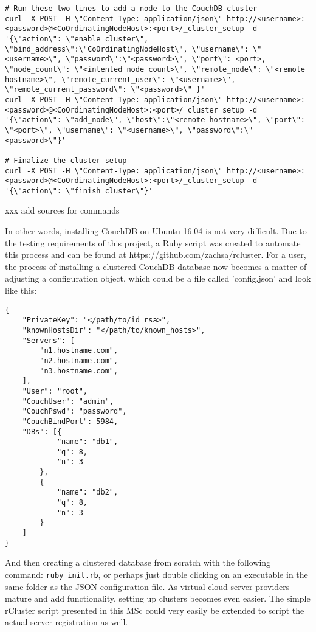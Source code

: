 \begin{verbatim}
# Run these two lines to add a node to the CouchDB cluster
curl -X POST -H \"Content-Type: application/json\" http://<username>:<password>@<CoOrdinatingNodeHost>:<port>/_cluster_setup -d '{\"action\": \"enable_cluster\", \"bind_address\":\"CoOrdinatingNodeHost\", \"username\": \"<username>\", \"password\":\"<password>\", \"port\": <port>, \"node_count\": \"<intented node count>\", \"remote_node\": \"<remote hostname>\", \"remote_current_user\": \"<username>\", \"remote_current_password\": \"<password>\" }'
curl -X POST -H \"Content-Type: application/json\" http://<username>:<password>@<CoOrdinatingNodeHost>:<port>/_cluster_setup -d '{\"action\": \"add_node\", \"host\":\"<remote hostname>\", \"port\": \"<port>\", \"username\": \"<username>\", \"password\":\"<password>\"}'

# Finalize the cluster setup
curl -X POST -H \"Content-Type: application/json\" http://<username>:<password>@<CoOrdinatingNodeHost>:<port>/_cluster_setup -d '{\"action\": \"finish_cluster\"}'
\end{verbatim}

xxx add sources for commands

In other words, installing CouchDB on Ubuntu 16.04 is not very difficult. Due to the testing requirements of this project, a Ruby script was created to automate this process and can be found at \url{https://github.com/zachsa/rcluster}. For a user, the process of installing a clustered CouchDB database now becomes a matter of adjusting a configuration object, which could be a file called 'config.json' and look like this:

\begin{verbatim}
{
    "PrivateKey": "</path/to/id_rsa>",
    "knownHostsDir": "</path/to/known_hosts>",
    "Servers": [
        "n1.hostname.com",
        "n2.hostname.com",
        "n3.hostname.com",
    ],
    "User": "root",
    "CouchUser": "admin",
    "CouchPswd": "password",
    "CouchBindPort": 5984,
    "DBs": [{
            "name": "db1",
            "q": 8,
            "n": 3
        },
        {
            "name": "db2",
            "q": 8,
            "n": 3
        }
    ]
}
\end{verbatim}

And then creating a clustered database from scratch with the following command: \texttt{ruby init.rb}, or perhaps just double clicking on an executable in the same folder as the JSON configuration file. As virtual cloud server providers mature and add functionality, setting up clusters becomes even easier. The simple rCluster script presented in this MSc could very easily be extended to script the actual server registration as well.


